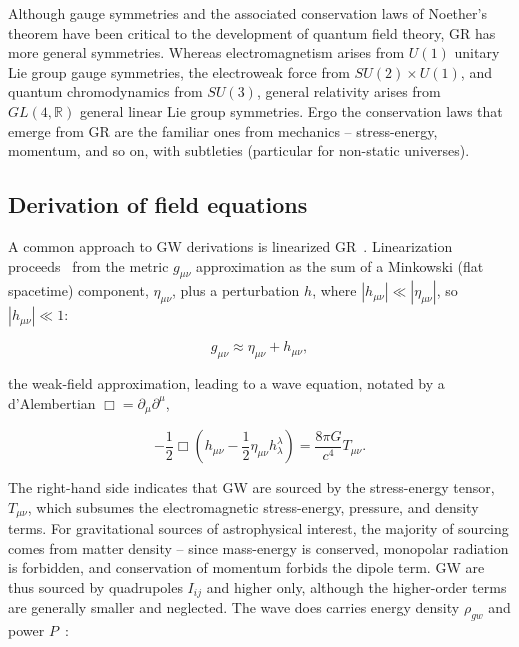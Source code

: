 Although gauge symmetries and the associated conservation laws of Noether's theorem have been critical to the development of quantum field theory, GR has more general symmetries. 
Whereas electromagnetism arises from $U(1)$ unitary Lie group gauge symmetries, the electroweak force from $SU(2) \times U(1)$, and quantum chromodynamics from $SU(3)$, general relativity arises from $GL(4, \mathbb{R})$ general linear Lie group symmetries. 
Ergo the conservation laws that emerge from GR are the familiar ones from mechanics -- stress-energy, momentum, and so on, with subtleties (particular for non-static universes).



        \subsection{Derivation of field equations}
        \label{field_equations}

            A common approach to GW derivations is linearized GR~\cite{FlanaganHughes2005}.
            Linearization proceeds~\cite{AdhikariThesis} from the metric $g_{\mu\nu}$ approximation as the sum of a Minkowski (flat spacetime) component, $\eta_{\mu\nu}$, plus a perturbation $h$, where $|h_{\mu\nu}| \ll |\eta_{\mu\nu}|$, so $|h_{\mu\nu}| \ll 1$:

\begin{equation}
g_{\mu \nu} \approx \eta_{\mu \nu} + h_{\mu \nu},
\label{perturbation_eq}
\end{equation}

\noindent the weak-field approximation, leading to a wave equation, notated by a d'Alembertian $\Box = \partial_\mu \partial^\mu$,

\begin{equation}
-\frac{1}{2} \Box \left(h_{\mu \nu} - \frac{1}{2} \eta_{\mu \nu} h_{\lambda}^{\lambda} \right) = \frac{8 \pi G}{c^4} T_{\mu \nu}.
\end{equation}

The right-hand side indicates that GW are sourced by the stress-energy tensor, $T_{\mu\nu}$, which subsumes the electromagnetic stress-energy, pressure, and density terms. 
For gravitational sources of astrophysical interest, the majority of sourcing comes from matter density -- since mass-energy is conserved, monopolar radiation is forbidden, and conservation of momentum forbids the dipole term. 
GW are thus sourced by quadrupoles $I_{ij}$ and higher only, although the higher-order terms are generally smaller and neglected. 
The wave does carries energy density $\rho_{gw}$ and power $P$~\cite{BallmerThesis}:

